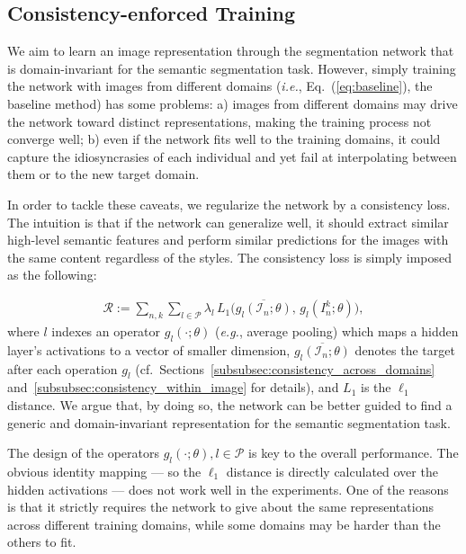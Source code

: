 \documentclass[10pt,twocolumn,letterpaper]{article}
\begin{document}
\subsection{Consistency-enforced Training}
We aim to learn an image representation through the segmentation network that is domain-invariant for the semantic segmentation task. However, simply training the network with images from different domains (\textit{i.e.}, Eq.~(\ref{eq:baseline}), the baseline method) has some problems: a) images from different domains may drive the network toward distinct representations, making the training process not converge well; b) even if the network fits well to the training domains, it could capture the idiosyncrasies of each individual and yet fail at interpolating between them or to the new target domain.

In order to tackle these caveats, we  regularize the network by a consistency loss. The intuition is that if the network can generalize well, it should extract similar high-level semantic features and perform similar predictions for the images with the same content regardless of the styles.  The consistency loss is simply imposed as the following:

\begin{align}
\label{equ:consistent-domains}
\mathcal{R}:=\sum_{n,k}\sum_{l\in \mathcal{P}}\lambda_l\, L_{1}\Big(\overline{g_l(\mathcal{I}_n;\theta)},\, g_l(I_n^k;\theta)\Big),
\end{align}
where $l$ indexes an operator $g_l(\cdot;\theta)$ (\textit{e.g.}, average pooling) which maps a hidden layer's activations to a vector of smaller dimension, $\overline{g_l(\mathcal{I}_n;\theta)}$ denotes the target after each operation $g_l$ (cf.\ Sections~\ref{subsubsec:consistency_across_domains} and~\ref{subsubsec:consistency_within_image} for details), and $L_1$ is the $\ell_1$ distance. We argue that, by doing so, the network can be better guided to find a generic and domain-invariant representation for the semantic segmentation task.


The design of the operators $g_l(\cdot;\theta), l\in \mathcal{P}$ is key to the overall performance. The obvious identity mapping --- so the $\ell_1$ distance is directly calculated over the hidden activations --- does not work well in the experiments. One of the reasons is that it strictly requires the network to give about the same representations across different training domains, while some domains may be harder than the others to fit. 
\vspace{-2mm}
\end{document}
